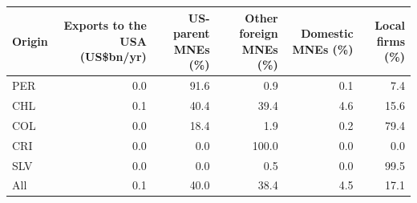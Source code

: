 \begin{tabular}{lrrrrr}
\toprule
Origin & Exports to the USA (US\$bn/yr) & US-parent MNEs (\%) & Other foreign MNEs (\%) & Domestic MNEs (\%) & Local firms (\%) \\
\midrule
PER & 0.0 & 91.6 & 0.9 & 0.1 & 7.4 \\
CHL & 0.1 & 40.4 & 39.4 & 4.6 & 15.6 \\
COL & 0.0 & 18.4 & 1.9 & 0.2 & 79.4 \\
CRI & 0.0 & 0.0 & 100.0 & 0.0 & 0.0 \\
SLV & 0.0 & 0.0 & 0.5 & 0.0 & 99.5 \\
\midrule
All & 0.1 & 40.0 & 38.4 & 4.5 & 17.1 \\
\bottomrule
\end{tabular}
